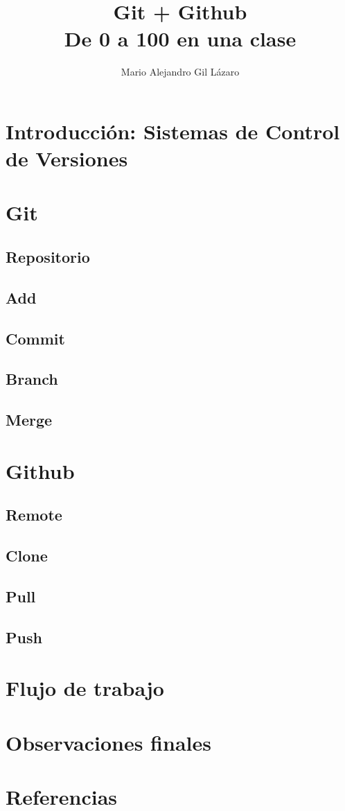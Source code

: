 \documentclass{scrartcl}
\title{Git + Github \\ \Large{De 0 a 100 en una clase}}
\author{Mario Alejandro Gil Lázaro}
\begin{document}
 \tableofcontents \maketitle
\section{Introducción: Sistemas de Control de Versiones}
\section{Git}
\subsection{Repositorio}
\subsection{Add}
\subsection{Commit}
\subsection{Branch}
\subsection{Merge}
\section{Github}
\subsection{Remote}
\subsection{Clone}
\subsection{Pull}
\subsection{Push}
\section{Flujo de trabajo}
\section{Observaciones finales}
\section{Referencias}
\end{document}

